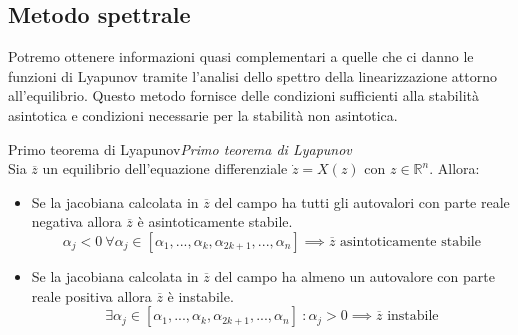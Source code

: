 \documentclass[11pt,a4paper,twoside]{book}
\newenvironment{proposizione}[1][\empty]{\begin{Proposizione}{
\ifx\empty#1\relax\else\mdseries\itshape#1\\\fi
}{}}{\end{Proposizione}}
\theoremstyle{esss}
\theoremstyle{dotless}
\numberwithin{equation}{section} %
\begin{document}
\subsection{Metodo spettrale}

Potremo ottenere informazioni quasi complementari a quelle che ci danno le funzioni di Lyapunov tramite l'analisi dello spettro della linearizzazione attorno all'equilibrio.
Questo metodo fornisce delle condizioni sufficienti alla stabilità asintotica e condizioni necessarie per la stabilità non asintotica.

\begin{proposizione}[Primo teorema di Lyapunov]
Sia $\overline{z}$ un equilibrio dell'equazione differenziale $\dot{z}=X(z)$ con $z\in\mathbb{R}^n$. Allora: \begin{itemize}[i.]
\item Se la jacobiana calcolata in $\overline{z}$ del campo ha tutti gli autovalori con parte reale negativa allora $\overline{z}$ è asintoticamente stabile.
\[
\alpha_j<0 \> \forall \alpha_j\in[\alpha_1,...,\alpha_k,\alpha_{2k+1},...,\alpha_n] \implies \overline{z} \text{ asintoticamente stabile}
\]
\item Se la jacobiana calcolata in $\overline{z}$ del campo ha almeno un autovalore con parte reale positiva allora $\overline{z}$ è instabile.
\[
\exists\alpha_j\in[\alpha_1,...,\alpha_k,\alpha_{2k+1},...,\alpha_n] \> : \alpha_j>0 \implies \overline{z} \text{ instabile}
\]
\end{itemize}
\end{proposizione}
\end{document}
